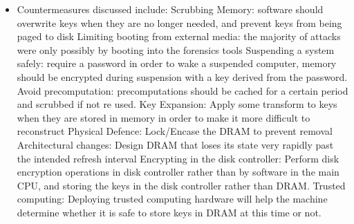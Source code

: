 \begin{itemize}
	\item Countermeasures discussed include:
	\subitem Scrubbing Memory: software should overwrite keys when they are no longer needed, and prevent keys from being paged to disk
	\subitem Limiting booting from external media: the majority of attacks were only possibly by booting into the forensics tools
	\subitem Suspending a system safely: require a password in order to wake a suspended computer, memory should be encrypted during suspension with a key derived from the password.
	\subitem Avoid precomputation: precomputations should be cached for a certain period and scrubbed if not re used.
	\subitem Key Expansion: Apply some transform to keys when they are stored in memory in order to make it more difficult to reconstruct
	\subitem Physical Defence: Lock/Encase the DRAM to prevent removal
	\subitem Architectural changes: Design DRAM that loses its state very rapidly past the intended refresh interval
	\subitem Encrypting in the disk controller: Perform disk encryption operations in disk controller rather than by software in the main CPU, and storing the keys in the disk controller rather than DRAM.
	\subitem Trusted computing: Deploying trusted computing hardware will help the machine determine whether it is safe to store keys in DRAM at this time or not.
\end{itemize}